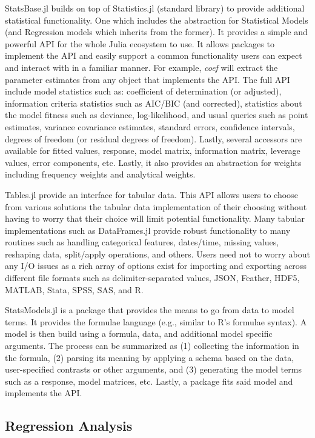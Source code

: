\documentclass{juliacon}
\begin{document}
StatsBase.jl builds on top of Statistics.jl (standard library) to provide additional statistical functionality. One which includes the abstraction for Statistical Models (and Regression models which inherits from the former). It provides a simple and powerful API for the whole Julia ecosystem to use. It allows packages to implement the API and easily support a common functionality users can expect and interact with in a familiar manner. For example, \textit{coef} will extract the parameter estimates from any object that implements the API. The full API include model statistics such as: coefficient of determination (or adjusted), information criteria statistics such as AIC/BIC (and corrected), statistics about the model fitness such as deviance, log-likelihood, and usual queries such as point estimates, variance covariance estimates, standard errors, confidence intervals, degrees of freedom (or residual degrees of freedom). Lastly, several accessors are available for fitted values, response, model matrix, information matrix, leverage values, error components, etc. Lastly, it also provides an abstraction for weights including frequency weights and analytical weights.

Tables.jl provide an interface for tabular data. This API allows users to choose from various solutions the tabular data implementation of their choosing without having to worry that their choice will limit potential functionality. Many tabular implementations such as DataFrames.jl provide robust functionality to many routines such as handling categorical features, dates/time, missing values, reshaping data, split/apply operations, and others. Users need not to worry about any I/O issues as a rich array of options exist for importing and exporting across different file formats such as delimiter-separated values, JSON, Feather, HDF5, MATLAB, Stata, SPSS, SAS, and R.

StatsModels.jl is a package that provides the means to go from data to model terms. It provides the formulae language (e.g., similar to R's formulae syntax). A model is then build using a formula, data, and additional model specific arguments. The process can be summarized as (1) collecting the information in the formula, (2) parsing its meaning by applying a schema based on the data, user-specified contrasts or other arguments, and (3) generating the model terms such as a response, model matrices, etc. Lastly, a package fits said model and implements the API.

\subsection{Regression Analysis}
\end{document}
